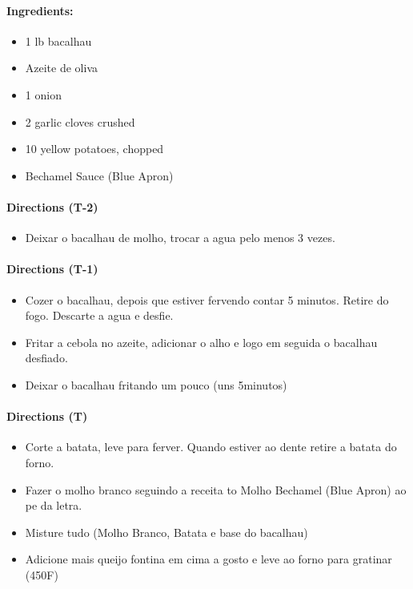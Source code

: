 \documentclass{article}
\begin{document}
\paragraph{Ingredients:}

\begin{itemize}
	\item 1 lb bacalhau
	\item Azeite de oliva
	\item 1 onion
	\item 2 garlic cloves crushed
	\item 10 yellow potatoes, chopped
	\item Bechamel Sauce (Blue Apron)
\end{itemize}

\paragraph{Directions (T-2)}
\begin{itemize}
	\item Deixar o bacalhau de molho, trocar a agua pelo menos 3 vezes.
\end{itemize}

\paragraph{Directions (T-1)}
\begin{itemize}
	\item Cozer o bacalhau, depois que estiver fervendo contar 5 minutos. Retire do fogo. Descarte a agua e desfie.
	\item Fritar a cebola no azeite, adicionar o alho e logo em seguida o bacalhau desfiado.
	\item Deixar o bacalhau fritando um pouco (uns 5minutos)
\end{itemize}


\paragraph{Directions (T)}
\begin{itemize}
	\item Corte a batata, leve para ferver. Quando estiver ao dente retire a batata do forno.
	\item Fazer o molho branco seguindo a receita to Molho Bechamel (Blue Apron) ao pe da letra.
	\item Misture tudo (Molho Branco, Batata e base do bacalhau)
	\item Adicione mais queijo fontina em cima a gosto e leve ao forno para gratinar (450F)
\end{itemize}
\end{document}
